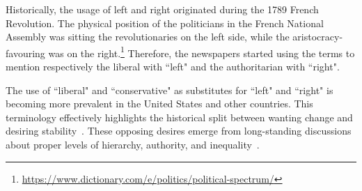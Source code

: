 
Historically, the usage of left and right originated during the 1789 French Revolution. The physical position of the politicians in the French National Assembly was sitting the revolutionaries on the left side, while the aristocracy-favouring was on the right.\footnote{\url{https://www.dictionary.com/e/politics/political-spectrum/}}
Therefore, the newspapers started using the terms to mention respectively the liberal with ``left" and the authoritarian with ``right".



The use of ``liberal" and ``conservative" as substitutes for ``left" and ``right" is becoming more prevalent in the United States and other countries.
This terminology effectively highlights the historical split between wanting change and desiring stability~\citep{jost2009political}.
These opposing desires emerge from long-standing discussions about proper levels of hierarchy, authority, and inequality~\citep{bobbio1996left}.





